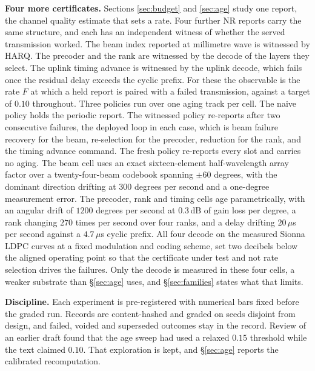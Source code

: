 \documentclass[conference]{IEEEtran}
\begin{document}
\textbf{Four more certificates.} Sections \ref{sec:budget} and \ref{sec:age}
study one report, the channel quality estimate that sets a rate. Four further NR
reports carry the same structure, and each has an independent witness of whether
the served transmission worked. The beam index reported at millimetre wave is
witnessed by HARQ. The precoder and the rank are witnessed by the decode of the
layers they select. The uplink timing advance is witnessed by the uplink decode,
which fails once the residual delay exceeds the cyclic prefix. For these the
observable is the rate $F$ at which a held report is paired with a failed
transmission, against a target of $0.10$ throughout. Three policies run over one
aging track per cell. The naive policy holds the periodic report. The witnessed
policy re-reports after two consecutive failures, the deployed loop in each case,
which is beam failure recovery for the beam, re-selection for the precoder,
reduction for the rank, and the timing advance command. The fresh policy
re-reports every slot and carries no aging. The beam cell uses an exact
sixteen-element half-wavelength array factor over a twenty-four-beam codebook
spanning $\pm 60$ degrees, with the dominant direction drifting at $300$ degrees
per second and a one-degree measurement error. The precoder, rank and timing
cells age parametrically, with an angular drift of $1200$ degrees per second at
$0.3$\,dB of gain loss per degree, a rank changing $270$ times per second over
four ranks, and a delay drifting $20\,\mu$s per second against a $4.7\,\mu$s
cyclic prefix. All four decode on the measured Sionna LDPC curves at a fixed
modulation and coding scheme, set two decibels below the aligned operating point
so that the certificate under test and not rate selection drives the failures.
Only the decode is measured in these four cells, a weaker substrate than
\S\ref{sec:age} uses, and \S\ref{sec:families} states what that limits.

\textbf{Discipline.} Each experiment is pre-registered with numerical bars fixed
before the graded run. Records are content-hashed and graded on seeds disjoint
from design, and failed, voided and superseded outcomes stay in the record.
Review of an earlier draft found that the age sweep had used a relaxed $0.15$
threshold while the text claimed $0.10$. That exploration is kept, and
\S\ref{sec:age} reports the calibrated recomputation.
\end{document}
